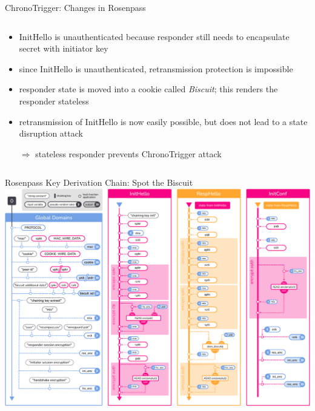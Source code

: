 \begin{frame}{ChronoTrigger: Changes in Rosenpass}
\begin{columns}[fullwidth,c]
    \begin{column}{.56\linewidth}
    \small
      \begin{itemize}
        \item InitHello is unauthenticated because responder still needs to encapsulate secret with initiator key
        \item since InitHello is unauthenticated, retransmission protection is impossible
        \item responder state is moved into a cookie called \emph{Biscuit}; this renders the responder stateless
        \item retransmission of InitHello is now easily possible, but does not lead to a state disruption attack
        \item[$\Rightarrow$] stateless responder prevents ChronoTrigger attack
      \end{itemize}
    \end{column}
  \end{columns}
\end{frame}

\begin{frame}{Rosenpass Key Derivation Chain: Spot the Biscuit}
  \centering
  \includegraphics[height=\extendedframetextheight]{graphics/rosenpass-wp-hashing-tree-rgb.pdf}
\end{frame}



